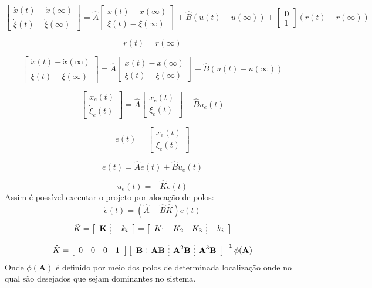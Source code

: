 \documentclass[
	article,			%
	11pt,				%
	oneside,			%
	a4paper,			%
	english,			%
	brazil,				%
	sumario=tradicional
	]{abntex2}
\begin{document}
$$
\left[
\begin{array}{c}
\dot x(t) - \dot x(\infty) \\
\dot \xi(t) - \dot \xi(\infty)
\end{array}
\right]
 = 
\hat{A}
\left[
\begin{array}{c}
x(t) - x(\infty)\\
\xi(t) - \xi(\infty)
\end{array}
\right]
+
\hat{B}
(u(t)-u(\infty))
+
\left[
\begin{array}{c}
\textbf{0}\\
1
\end{array}
\right]
(r(t)-r(\infty))
$$

$$
r(t)=r(\infty)
$$

$$
\left[
\begin{array}{c}
\dot x(t) - \dot x(\infty) \\
\dot \xi(t) - \dot \xi(\infty)
\end{array}
\right]
 = 
\hat{A}
\left[
\begin{array}{c}
x(t) - x(\infty)\\
\xi(t) - \xi(\infty)
\end{array}
\right]
+
\hat{B}
(u(t)-u(\infty))
$$

$$
\left[
\begin{array}{c}
\dot x_e(t) \\
\dot \xi_e(t)
\end{array}
\right]
 = 
\hat{A}
\left[
\begin{array}{c}
x_e(t)\\
\xi_e(t)
\end{array}
\right]
+
\hat{B}
u_e(t)
$$

$$
e(t)=
\left[
\begin{array}{c}
x_e(t)\\
\xi_e(t)
\end{array}
\right]
$$

$$
\dot e(t)
 = 
\hat{A}
e(t)
+
\hat{B}
u_e(t)
$$

$$
u_e(t) = -\hat{K}e(t)
$$
Assim é possível executar o projeto por alocação de polos:
$$
\dot e(t)=(\hat{A}-\hat{B}\hat{K})e(t)
$$
$$
\hat{K}
=
\left[
\begin{array}{c;{2pt/2pt}c}
\textbf{K} & -k_i
\end{array}
\right]
=
\left[
\begin{array}{ccc;{2pt/2pt}c}
K_1 & K_2 & K_3 & -k_i
\end{array}
\right]
$$

$$
\hat{K}
=
\left[
\begin{array}{cccc}
0 & 0 & 0 & 1
\end{array}
\right]
\left[
\begin{array}{c;{2pt/2pt}c;{2pt/2pt}c;{2pt/2pt}c}
\textbf{B} & \textbf{AB}  & \textbf{A}^2\textbf{B}  & \textbf{A}^3\textbf{B} 
\end{array}
\right]^{-1}
\phi(\textbf{A}) 
$$
Onde $\phi(\textbf{A})$ é definido por meio dos polos de determinada localização onde no qual são desejados que sejam dominantes no sistema. 
\end{document}
